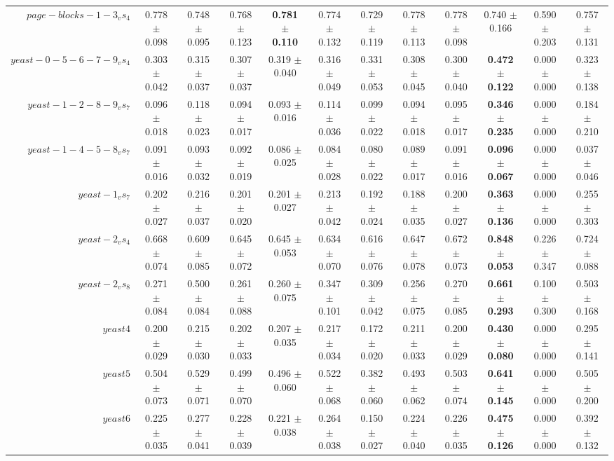 \begin{table}[!ht]
{\begin{tabular}{r c c c c c c c c c c c}
$page-blocks-1-3_vs_4$ & 0.778 $\pm$ 0.098 & 0.748 $\pm$ 0.095 & 0.768 $\pm$ 0.123 & \textbf{0.781 $\pm$ 0.110} & 0.774 $\pm$ 0.132 & 0.729 $\pm$ 0.119 & 0.778 $\pm$ 0.113 & 0.778 $\pm$ 0.098 & 0.740 $\pm$ 0.166 & 0.590 $\pm$ 0.203 & 0.757 $\pm$ 0.131 \\
$yeast-0-5-6-7-9_vs_4$ & 0.303 $\pm$ 0.042 & 0.315 $\pm$ 0.037 & 0.307 $\pm$ 0.037 & 0.319 $\pm$ 0.040 & 0.316 $\pm$ 0.049 & 0.331 $\pm$ 0.053 & 0.308 $\pm$ 0.045 & 0.300 $\pm$ 0.040 & \textbf{0.472 $\pm$ 0.122} & 0.000 $\pm$ 0.000 & 0.323 $\pm$ 0.138 \\
$yeast-1-2-8-9_vs_7$ & 0.096 $\pm$ 0.018 & 0.118 $\pm$ 0.023 & 0.094 $\pm$ 0.017 & 0.093 $\pm$ 0.016 & 0.114 $\pm$ 0.036 & 0.099 $\pm$ 0.022 & 0.094 $\pm$ 0.018 & 0.095 $\pm$ 0.017 & \textbf{0.346 $\pm$ 0.235} & 0.000 $\pm$ 0.000 & 0.184 $\pm$ 0.210 \\
$yeast-1-4-5-8_vs_7$ & 0.091 $\pm$ 0.016 & 0.093 $\pm$ 0.032 & 0.092 $\pm$ 0.019 & 0.086 $\pm$ 0.025 & 0.084 $\pm$ 0.028 & 0.080 $\pm$ 0.022 & 0.089 $\pm$ 0.017 & 0.091 $\pm$ 0.016 & \textbf{0.096 $\pm$ 0.067} & 0.000 $\pm$ 0.000 & 0.037 $\pm$ 0.046 \\
$yeast-1_vs_7$ & 0.202 $\pm$ 0.027 & 0.216 $\pm$ 0.037 & 0.201 $\pm$ 0.020 & 0.201 $\pm$ 0.027 & 0.213 $\pm$ 0.042 & 0.192 $\pm$ 0.024 & 0.188 $\pm$ 0.035 & 0.200 $\pm$ 0.027 & \textbf{0.363 $\pm$ 0.136} & 0.000 $\pm$ 0.000 & 0.255 $\pm$ 0.303 \\
$yeast-2_vs_4$ & 0.668 $\pm$ 0.074 & 0.609 $\pm$ 0.085 & 0.645 $\pm$ 0.072 & 0.645 $\pm$ 0.053 & 0.634 $\pm$ 0.070 & 0.616 $\pm$ 0.076 & 0.647 $\pm$ 0.078 & 0.672 $\pm$ 0.073 & \textbf{0.848 $\pm$ 0.053} & 0.226 $\pm$ 0.347 & 0.724 $\pm$ 0.088 \\
$yeast-2_vs_8$ & 0.271 $\pm$ 0.084 & 0.500 $\pm$ 0.084 & 0.261 $\pm$ 0.088 & 0.260 $\pm$ 0.075 & 0.347 $\pm$ 0.101 & 0.309 $\pm$ 0.042 & 0.256 $\pm$ 0.075 & 0.270 $\pm$ 0.085 & \textbf{0.661 $\pm$ 0.293} & 0.100 $\pm$ 0.300 & 0.503 $\pm$ 0.168 \\
$yeast4$ & 0.200 $\pm$ 0.029 & 0.215 $\pm$ 0.030 & 0.202 $\pm$ 0.033 & 0.207 $\pm$ 0.035 & 0.217 $\pm$ 0.034 & 0.172 $\pm$ 0.020 & 0.211 $\pm$ 0.033 & 0.200 $\pm$ 0.029 & \textbf{0.430 $\pm$ 0.080} & 0.000 $\pm$ 0.000 & 0.295 $\pm$ 0.141 \\
$yeast5$ & 0.504 $\pm$ 0.073 & 0.529 $\pm$ 0.071 & 0.499 $\pm$ 0.070 & 0.496 $\pm$ 0.060 & 0.522 $\pm$ 0.068 & 0.382 $\pm$ 0.060 & 0.493 $\pm$ 0.062 & 0.503 $\pm$ 0.074 & \textbf{0.641 $\pm$ 0.145} & 0.000 $\pm$ 0.000 & 0.505 $\pm$ 0.200 \\
$yeast6$ & 0.225 $\pm$ 0.035 & 0.277 $\pm$ 0.041 & 0.228 $\pm$ 0.039 & 0.221 $\pm$ 0.038 & 0.264 $\pm$ 0.038 & 0.150 $\pm$ 0.027 & 0.224 $\pm$ 0.040 & 0.226 $\pm$ 0.035 & \textbf{0.475 $\pm$ 0.126} & 0.000 $\pm$ 0.000 & 0.392 $\pm$ 0.132 \\

\end{tabular}}
\end{table}
